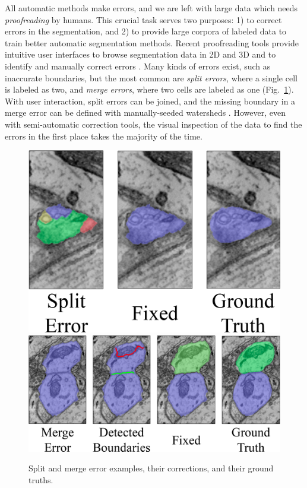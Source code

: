 All automatic methods make errors, and we are left with large data which needs \emph{proofreading} by humans. This crucial task serves two purposes: 1) to correct errors in the segmentation, and 2) to provide large corpora of labeled data to train better automatic segmentation methods. Recent proofreading tools provide intuitive user interfaces to browse segmentation data in 2D and 3D and to identify and manually correct errors \cite{markus_proofreading,raveler,mojo2,haehn_dojo_2014}. Many kinds of errors exist, such as inaccurate boundaries, but the most common are \emph{split errors}, where a single cell is labeled as two, and \emph{merge errors}, where two cells are labeled as one (Fig.~\ref{fig:merge_error}). With user interaction, split errors can be joined, and the missing boundary in a merge error can be defined with manually-seeded watersheds \cite{haehn_dojo_2014}. However, even with semi-automatic correction tools, the visual inspection of the data to find the errors in the first place takes the majority of the time.

\begin{figure}[t]
\centering
\includegraphics[scale=.1275]{gfx/spliterror_2.png}
\qquad
\includegraphics[scale=.1225]{gfx/mergeerror_new_2.png}
\caption{Split and merge error examples, their corrections, and their ground truths.}
\label{fig:merge_error}
\end{figure}

